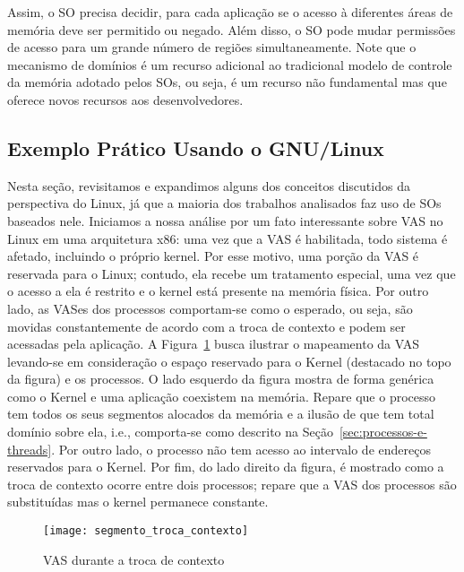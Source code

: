 Assim, o SO precisa decidir, para cada aplicação se o acesso à diferentes áreas
de memória deve ser permitido ou negado.  Além disso, o SO pode mudar
permissões de acesso para um grande número de regiões simultaneamente. Note que o
mecanismo de domínios é um recurso adicional ao tradicional modelo de controle
da memória adotado pelos SOs, ou seja, é um recurso não fundamental mas que
oferece novos recursos aos desenvolvedores.

\subsection{Exemplo Prático Usando o GNU/Linux}
\label{sec:visao_pratica_mem}

Nesta seção, revisitamos e expandimos alguns dos conceitos discutidos da
perspectiva do Linux, já que a maioria dos trabalhos analisados faz uso
de SOs baseados nele. Iniciamos a nossa análise por um fato interessante sobre VAS no Linux em uma
arquitetura x86: uma vez que a VAS é habilitada, todo sistema é afetado,
incluindo o próprio kernel. Por esse motivo, uma porção da VAS é reservada para
o Linux; contudo, ela recebe um tratamento especial, uma vez que o acesso a ela é
restrito e o kernel está presente na memória física. Por outro lado, as VASes dos
processos comportam-se como o esperado, ou seja, são movidas constantemente de
acordo com a troca de contexto e podem ser acessadas pela aplicação. A
Figura~\ref{fig:vas_contexto} busca ilustrar o mapeamento da VAS levando-se em
consideração o espaço reservado para o Kernel (destacado no topo da figura) e os
processos. O lado esquerdo da figura mostra de forma genérica como o Kernel e
uma aplicação coexistem na memória. Repare que o processo tem todos os seus
segmentos alocados da memória e a ilusão de que tem total domínio sobre ela,
i.e., comporta-se como descrito na Seção~\ref{sec:processos-e-threads}. Por
outro lado, o processo não tem acesso ao intervalo de endereços reservados
para o Kernel. Por fim, do lado direito da figura, é mostrado como a troca de
contexto ocorre entre dois processos; repare que a VAS dos processos são
substituídas mas o kernel permanece constante.

\begin{figure}[!h]
  \centering
  \texttt{[image: segmento\_troca\_contexto]}
  \caption{VAS durante a troca de contexto~\citep{kernel_manage_mem}}
  \label{fig:vas_contexto}
\end{figure}

